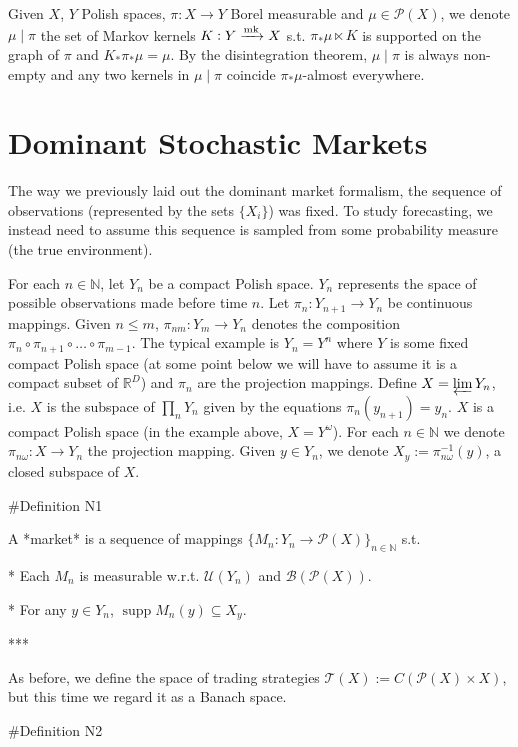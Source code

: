 \documentclass[a4paper]{article}
\DeclareMathOperator{\Supp}{supp}
\newcommand{\Nats}{\mathbb{N}}
\newcommand{\Reals}{\mathbb{R}}
\newcommand{\Markov}{\xrightarrow{\textnormal{mk}}}
\newcommand{\Prob}{\mathcal{P}}
\newcommand{\T}{\mathcal{T}}
\newcommand{\B}{\mathcal{B}}
\newcommand{\UM}{\mathcal{U}}
\begin{document}
Given ${X}$, ${Y}$ Polish spaces, ${\pi: X \rightarrow Y}$ Borel measurable and ${\mu \in \Prob(X)}$, we denote ${\mu \mid \pi}$ the set of Markov kernels ${K: Y \Markov X}$ s.t. ${\pi_* \mu \ltimes K}$ is supported on the graph of ${\pi}$ and ${K_*\pi_* \mu = \mu}$. By the disintegration theorem, ${\mu \mid \pi}$ is always non-empty and any two kernels in ${\mu \mid \pi}$ coincide ${\pi_*\mu}$-almost everywhere.

\section{Dominant Stochastic Markets}

The way we previously laid out the dominant market formalism, the sequence of observations (represented by the sets $\{X_i\}$) was fixed. To study forecasting, we instead need to assume this sequence is sampled from some probability measure (the true environment).

For each ${n \in \Nats}$, let ${Y_n}$ be a compact Polish space. ${Y_n}$ represents the space of possible observations made before time ${n}$. Let ${\pi_n: Y_{n+1} \rightarrow Y_n}$ be continuous mappings. Given ${n \leq m}$, ${\pi_{nm}: Y_m \rightarrow Y_n}$ denotes the composition $\pi_n \circ \pi_{n+1} \circ \ldots \circ \pi_{m-1}$. The typical example is ${Y_n=Y^n}$ where ${Y}$ is some fixed compact Polish space (at some point below we will have to assume it is a compact subset of ${\Reals^D}$) and ${\pi_n}$ are the projection mappings. Define ${X = \varprojlim Y_n}$, i.e. ${X}$ is the subspace of ${\prod_n Y_n}$ given by the equations ${\pi_n(y_{n+1})=y_n}$. ${X}$ is a compact Polish space (in the example above, ${X = Y^\omega}$). For each ${n \in \Nats}$ we denote ${\pi_{n\omega}: X \rightarrow Y_n}$ the projection mapping. Given ${y \in Y_n}$, we denote ${X_y:=\pi_{n\omega}^{-1}(y)}$, a closed subspace of ${X}$.

\#Definition N1

A *market* is a sequence of mappings ${\{M_n: Y_n \rightarrow \Prob(X)\}}_{n \in \Nats}$ s.t.

* Each ${M_n}$ is measurable w.r.t. ${\UM(Y_n)}$ and ${\B(\Prob(X))}$.

* For any ${y \in Y_n}$, ${\Supp M_n(y) \subseteq X_y}$.

***

As before, we define the space of trading strategies ${\T(X):=C(\Prob(X)\times X)}$, but this time we regard it as a Banach space. 

\#Definition N2
\end{document}
